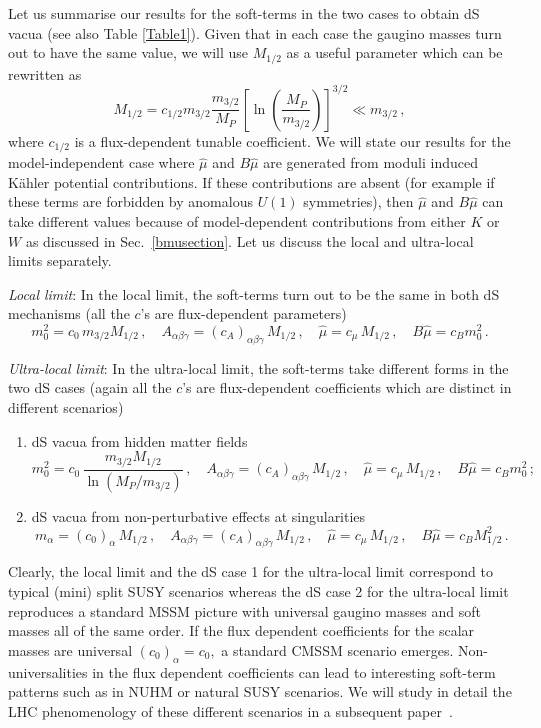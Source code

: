 \documentclass[11pt,a4paper]{article}
\newcommand{\be}{\begin{equation}}
\newcommand{\ee}{\end{equation}}
\begin{document}
Let us summarise our results for the soft-terms in the two cases to obtain dS vacua (see also Table \ref{Table1}).
Given that in each case the gaugino masses turn out to have the same value,
we will use $M_{1/2}$ as a useful parameter which can be rewritten as
\be
M_{1/2} = c_{1/2} m_{3/2} \frac{m_{3/2}}{M_P}\left[\ln\left(\frac{M_P}{m_{3/2}}\right)\right]^{3/2}\ll m_{3/2}\, ,
\ee
where $c_{1/2}$ is a flux-dependent tunable coefficient.
We will state our results for the model-independent case where $\hat\mu$ and $B\hat\mu$ are generated
from moduli induced K\"ahler potential contributions. If these contributions are absent (for example if these terms are forbidden by anomalous $U(1)$ symmetries), then $\hat\mu$ and $B\hat\mu$ can take different values because of model-dependent contributions from either $K$ or $W$
as discussed in Sec.~\ref{bmusection}. Let us discuss the local and ultra-local limits separately.

\medskip
\emph{Local limit}: In the local limit, the soft-terms turn out to be the same in both dS mechanisms
(all the $c$'s are flux-dependent parameters)
\be
m_0^2 = c_0\,m_{3/2} M_{1/2}\,,\quad A_{\alpha\beta\gamma} = (c_A)_{\alpha\beta\gamma}\,M_{1/2}\,,
\quad\hat\mu= c_\mu\,M_{1/2}\,,\quad B\hat\mu = c_B m_0^2\,.
\ee

\medskip
\emph{Ultra-local limit}: In the ultra-local limit, the soft-terms take different forms in the two dS cases
(again all the $c$'s are flux-dependent coefficients which are distinct in different scenarios)
\begin{enumerate}
\item dS vacua from hidden matter fields
\be
m_0^2 = c_{0}\,\frac{m_{3/2}M_{1/2}}{\ln\left(M_P/m_{3/2}\right)}\,,\quad A_{\alpha\beta\gamma} = (c_A)_{\alpha\beta\gamma}\,M_{1/2}\,,
\quad\hat\mu= c_\mu\,M_{1/2}\,,\quad B\hat\mu = c_{B} m_0^2\,;
\ee
\item dS vacua from non-perturbative effects at singularities
\be
m_\alpha = (c_{0})_\alpha\,M_{1/2}\,,\quad A_{\alpha\beta\gamma} = (c_A)_{\alpha\beta\gamma}\,M_{1/2}\,,
\quad\hat\mu= c_\mu\,M_{1/2}\,,\quad B\hat\mu = c_{B} M_{1/2}^2\,.
\ee
\end{enumerate}
Clearly, the local limit and the dS case 1 for the ultra-local limit correspond to typical (mini) split SUSY scenarios whereas
the dS case 2 for the ultra-local limit reproduces a standard MSSM picture with universal gaugino masses and soft masses all of the same order. If the flux dependent coefficients for the scalar masses are universal $(c_0)_\alpha=c_0,$ a standard CMSSM scenario emerges. Non-universalities in the flux dependent coefficients can lead to interesting soft-term patterns such as in NUHM or natural SUSY scenarios. We will study in detail the LHC phenomenology
of these different scenarios in a subsequent paper~\cite{us}.
\end{document}
